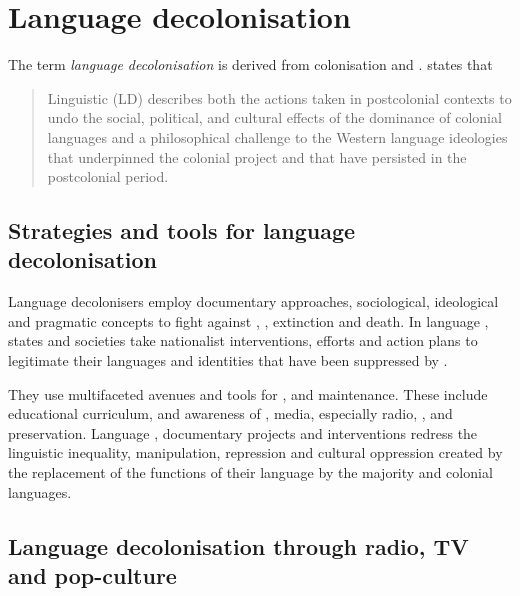 \documentclass[output=paper,
modfonts
]{langscibook}
\begin{document}
\section{Language decolonisation}

The term \textit{language decolonisation} is derived from colonisation and . \citet[534]{Jaffe2009} states that 

\begin{quote}
Linguistic  (LD) describes both the actions taken in postcolonial contexts to undo the social, political, and cultural effects of the dominance of colonial languages and a philosophical challenge to the Western language ideologies that underpinned the colonial project and that have persisted in the postcolonial period.
\end{quote}

\subsection{Strategies and tools for language decolonisation}

Language decolonisers employ documentary approaches, sociological, ideological and pragmatic concepts to fight against , , extinction and death. In language , states and societies take nationalist interventions, efforts and action plans to legitimate their languages and identities that have been suppressed by . 

They use multifaceted avenues and tools for , and maintenance. These include educational curriculum,  and awareness of , media, especially radio, ,  and preservation. Language , documentary projects and interventions redress the linguistic inequality, manipulation, repression and cultural oppression created by the replacement of the functions of their language by the majority and colonial languages. 


\subsection{Language decolonisation through radio, TV and pop-culture}
\end{document}

